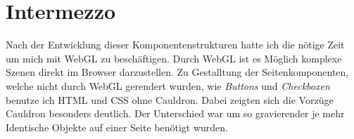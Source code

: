 \documentclass[12pt]{article}
\begin{document}
\section{Intermezzo}

Nach der Entwicklung dieser Komponentenstrukturen hatte ich die nötige Zeit um mich mit WebGL zu beschäftigen. Durch WebGL ist es Möglich
komplexe Szenen direkt im Browser darzustellen. Zu Gestalltung der Seitenkomponenten, welche nicht durch WebGL gerendert wurden, wie \textit{Buttons}
und \textit{Checkboxen} benutze ich HTML und CSS ohne Cauldron. Dabei zeigten sich die Vorzüge Cauldron besonders deutlich.
Der Unterschied war um so gravierender je mehr Identische Objekte auf einer Seite benötigt wurden.
\end{document}
